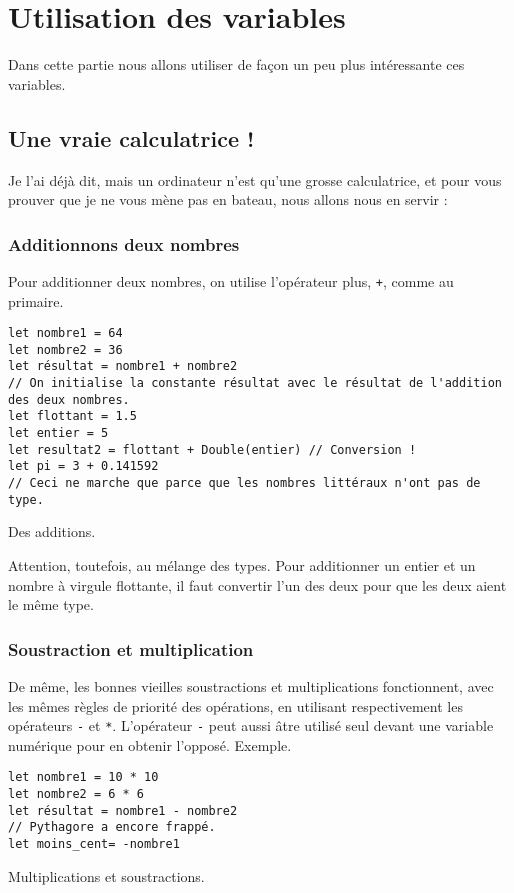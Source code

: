 \chapter{Utilisation des variables}

Dans cette partie nous allons utiliser de façon un peu plus intéressante ces variables.

\section{Une vraie calculatrice !}
Je l'ai déjà dit, mais un ordinateur n'est qu'une grosse calculatrice, et pour vous prouver que
je ne vous mène pas en bateau, nous allons nous en servir :
\subsection{Additionnons deux nombres}
Pour additionner deux nombres, on utilise l'opérateur plus, \verb"+", comme au primaire.
\begin{listing}
\begin{verbatim}
let nombre1 = 64
let nombre2 = 36
let résultat = nombre1 + nombre2
// On initialise la constante résultat avec le résultat de l'addition des deux nombres.
let flottant = 1.5
let entier = 5
let resultat2 = flottant + Double(entier) // Conversion !
let pi = 3 + 0.141592 
// Ceci ne marche que parce que les nombres littéraux n'ont pas de type.
\end{verbatim}
\caption{Des additions.}
\end{listing}

Attention, toutefois, au mélange des types. Pour additionner un entier et un nombre à virgule flottante, il faut convertir l'un des deux pour que les deux aient le même type. 
\subsection{Soustraction et multiplication}
De même, les bonnes vieilles soustractions et multiplications fonctionnent, avec les mêmes règles de priorité des opérations, en utilisant respectivement les opérateurs \verb"-" et \verb"*".
L'opérateur \verb"-" peut aussi âtre utilisé seul devant une variable numérique pour en obtenir l'opposé.
Exemple.
\begin{listing}
\begin{verbatim}
let nombre1 = 10 * 10
let nombre2 = 6 * 6
let résultat = nombre1 - nombre2
// Pythagore a encore frappé. 
let moins_cent= -nombre1
\end{verbatim}
\caption{Multiplications et soustractions.}
\end{listing}

